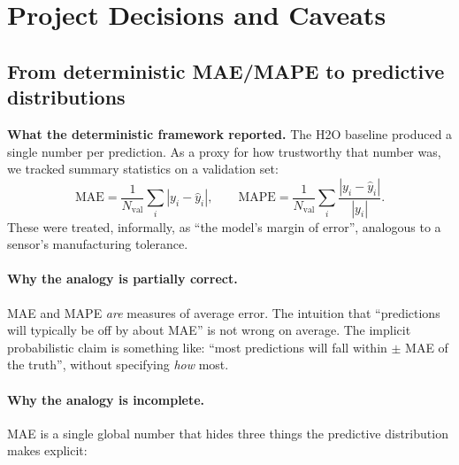 \documentclass[11pt,a4paper]{article}
\begin{document}
\section{Project Decisions and Caveats}
\label{sec:decisions}

\subsection{From deterministic MAE/MAPE to predictive distributions}
\label{sec:mae-to-distribution}

\begin{recapbox}
\textbf{What the deterministic framework reported.} The H2O baseline produced
a single number per prediction. As a proxy for how trustworthy that number
was, we tracked summary statistics on a validation set:
\[
\text{MAE} = \frac{1}{N_{\text{val}}}\sum_i |y_i - \hat y_i|,
\qquad
\text{MAPE} = \frac{1}{N_{\text{val}}}\sum_i \frac{|y_i - \hat y_i|}{|y_i|}.
\]
These were treated, informally, as ``the model's margin of error'', analogous
to a sensor's manufacturing tolerance.
\end{recapbox}

\paragraph{Why the analogy is partially correct.} MAE and MAPE \emph{are}
measures of average error. The intuition that ``predictions will typically
be off by about MAE'' is not wrong on average. The implicit probabilistic
claim is something like: ``most predictions will fall within $\pm$ MAE of
the truth'', without specifying \emph{how} most.

\paragraph{Why the analogy is incomplete.} MAE is a single global number
that hides three things the predictive distribution makes explicit:
\end{document}
